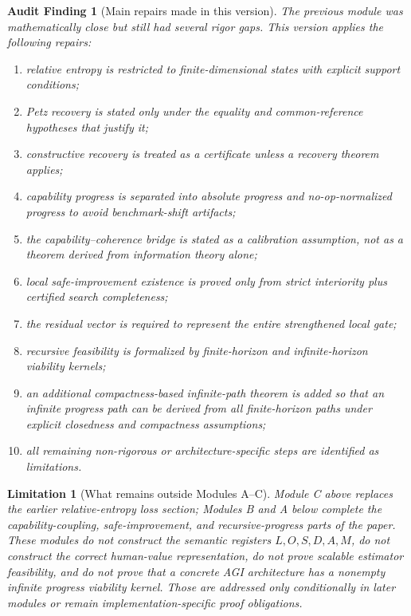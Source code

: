 \documentclass[11pt]{article}
\newtheorem{limitation}[theorem]{Limitation}
\newcommand{\1}{\mathbf{1}}
\newtheorem{audit}[theorem]{Audit Finding}
\begin{document}
\begin{audit}[Main repairs made in this version]
The previous module was mathematically close but still had several rigor gaps.  This version applies the following repairs:
\begin{enumerate}[label=(\alph*)]
    \item relative entropy is restricted to finite-dimensional states with explicit support conditions;
    \item Petz recovery is stated only under the equality and common-reference hypotheses that justify it;
    \item constructive recovery is treated as a certificate unless a recovery theorem applies;
    \item capability progress is separated into absolute progress and no-op-normalized progress to avoid benchmark-shift artifacts;
    \item the capability--coherence bridge is stated as a calibration assumption, not as a theorem derived from information theory alone;
    \item local safe-improvement existence is proved only from strict interiority plus certified search completeness;
    \item the residual vector is required to represent the entire strengthened local gate;
    \item recursive feasibility is formalized by finite-horizon and infinite-horizon viability kernels;
    \item an additional compactness-based infinite-path theorem is added so that an infinite progress path can be derived from all finite-horizon paths under explicit closedness and compactness assumptions;
    \item all remaining non-rigorous or architecture-specific steps are identified as limitations.
\end{enumerate}
\end{audit}

\begin{limitation}[What remains outside Modules A--C]
Module C above replaces the earlier relative-entropy loss section; Modules B and A below complete the capability-coupling, safe-improvement, and recursive-progress parts of the paper.  These modules do not construct the semantic registers \(L,O,S,D,A,M\), do not construct the correct human-value representation, do not prove scalable estimator feasibility, and do not prove that a concrete AGI architecture has a nonempty infinite progress viability kernel.  Those are addressed only conditionally in later modules or remain implementation-specific proof obligations.
\end{limitation}
\end{document}
